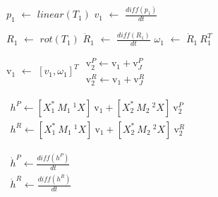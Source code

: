 \documentclass[12pt,a4paper]{report}
\begin{document}
\begin{algorithm}[H]
\begin{algorithmic}[1]
             \STATE $p_1$ $\leftarrow$ $linear(T_1)$
             \STATE $v_{1}$ $\leftarrow$ $\frac{diff(p_1)}{dt}$
        
             \STATE $R_1$ $\leftarrow$ $rot(T_1)$
             \STATE $\dot{R}_1$ $\leftarrow$ $\frac{diff(R_1)}{dt}$
             \STATE $\omega_{1}$ $\leftarrow$ $\dot{R}_1 \ R_1^T$
             
             \STATE $\mathrm{v}_1$ $\leftarrow$ $[v_{1},\omega_{1}]^T$ \hspace*{3cm} 
             \vspace*{0.3cm}
             \STATE $\begin{matrix}
					 \mathrm{v}^P_2 \leftarrow \mathrm{v}_1 + \mathrm{v}_J^P \\
					 \mathrm{v}^R_2 \leftarrow \mathrm{v}_1 + \mathrm{v}_J^R
                     \end{matrix}$ \hspace*{3.3cm} 
             \vspace*{0.3cm}
        
             \STATE $\begin{matrix}
					h^P \leftarrow [{X}_1^* \ M_1 \ ^1{X}] \ \mathrm{v}_1 + [{X}_2^* \ M_2 \ ^2{X}] \ \mathrm{v}_2^P \\
					h^R \leftarrow [{X}_1^* \ M_1 \ ^1{X}] \ \mathrm{v}_1 + [{X}_2^* \ M_2 \ ^2X] \ \mathrm{v}_2^R
                     \end{matrix}$ \hspace*{1.3cm} 
            \vspace*{0.3cm}
            
             \STATE $\begin{matrix}
             			\dot{h}^P \leftarrow \frac{diff(h^P)}{dt} \\
             			\dot{h}^R \leftarrow \frac{diff(h^R)}{dt}
             		  \end{matrix}$ \hspace*{3.2cm} 


\end{algorithmic}
\end{algorithm}
\end{document}

